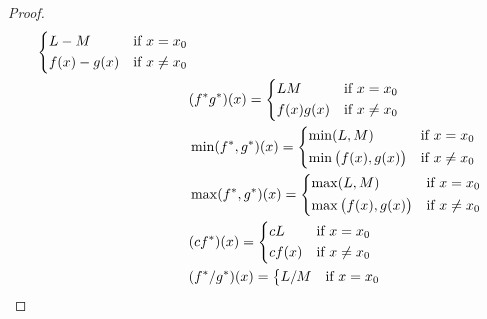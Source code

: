 \begin{proof}
\begin{align*}
\begin{dcases}
                                                         L - M       & \text{if } x = x_0    \\
                                                         f(x) - g(x) & \text{if } x \neq x_0
                                                       \end{dcases}                     \\
                                    & (f^* g^*)(x) = \begin{dcases}
                                                       LM        & \text{if } x = x_0    \\
                                                       f(x) g(x) & \text{if } x \neq x_0
                                                     \end{dcases}                         \\
                                    & \min(f^*, g^*)(x) = \begin{dcases}
                                                            \min(L, M)               & \text{if } x = x_0    \\
                                                            \min\big(f(x), g(x)\big) & \text{if } x \neq x_0
                                                          \end{dcases}     \\
                                    & \max(f^*, g^*)(x) = \begin{dcases}
                                                            \max(L, M)               & \text{if } x = x_0    \\
                                                            \max\big(f(x), g(x)\big) & \text{if } x \neq x_0
                                                          \end{dcases}     \\
                                    & (c f^*)(x) = \begin{dcases}
                                                     cL     & \text{if } x = x_0    \\
                                                     c f(x) & \text{if } x \neq x_0
                                                   \end{dcases}                              \\
                                    & (f^* / g^*)(x) = \begin{dcases}
                                                         L / M       & \text{if } x = x_0    \\

\end{dcases}
\end{align*}
\end{proof}
